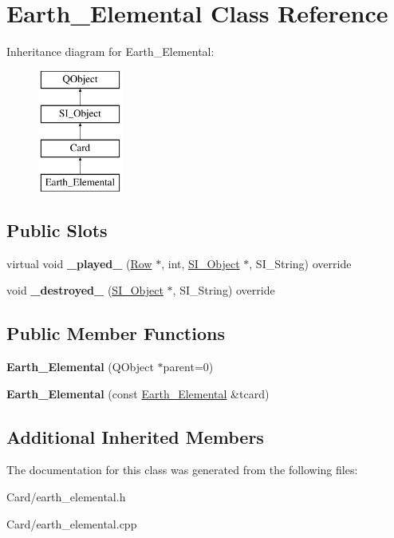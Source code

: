 \hypertarget{class_earth___elemental}{}\section{Earth\+\_\+\+Elemental Class Reference}
\label{class_earth___elemental}
Inheritance diagram for Earth\+\_\+\+Elemental\+:\begin{figure}[H]
\begin{center}
\leavevmode
\includegraphics[height=4.000000cm]{class_earth___elemental}
\end{center}
\end{figure}
\subsection*{Public Slots}
\begin{DoxyCompactItemize}
\item 
\mbox{\label{class_earth___elemental_a7c89d69d196d48a8da71524821ccd0df}} 
virtual void {\bfseries \+\_\+played\+\_\+} (\hyperlink{class_card_set}{Row} $\ast$, int, \hyperlink{class_s_i___object}{S\+I\+\_\+\+Object} $\ast$, S\+I\+\_\+\+String) override
\item 
\mbox{\label{class_earth___elemental_abe9ea9a985aa54f09677bd912f945e8f}} 
void {\bfseries \+\_\+destroyed\+\_\+} (\hyperlink{class_s_i___object}{S\+I\+\_\+\+Object} $\ast$, S\+I\+\_\+\+String) override
\end{DoxyCompactItemize}
\subsection*{Public Member Functions}
\begin{DoxyCompactItemize}
\item 
\mbox{\label{class_earth___elemental_a2cac54675cb6e0d1a22aa126be30218a}} 
{\bfseries Earth\+\_\+\+Elemental} (Q\+Object $\ast$parent=0)
\item 
\mbox{\label{class_earth___elemental_ae944411657c48b19db370862cd2d736c}} 
{\bfseries Earth\+\_\+\+Elemental} (const \hyperlink{class_earth___elemental}{Earth\+\_\+\+Elemental} \&tcard)
\end{DoxyCompactItemize}
\subsection*{Additional Inherited Members}


The documentation for this class was generated from the following files\+:\begin{DoxyCompactItemize}
\item 
Card/earth\+\_\+elemental.\+h\item 
Card/earth\+\_\+elemental.\+cpp\end{DoxyCompactItemize}

